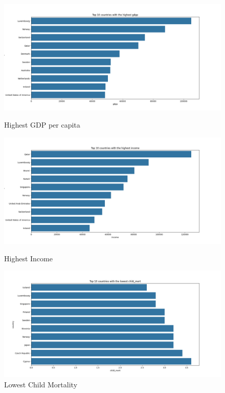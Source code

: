 \documentclass{article}
\begin{document}
\begin{figure}[H]
    \centering
    \begin{minipage}{0.8\textwidth}
        \centering
        \includegraphics[width=\linewidth]{plot/highest_gdpp.png}
        \caption{Highest GDP per capita}
        \label{fig:highest_gdpp}
    \end{minipage}
    \hfill
    \begin{minipage}{0.8\textwidth}
        \centering
        \includegraphics[width=\linewidth]{plot/highest_income.png}
        \caption{Highest Income}
        \label{fig:highest_income}
    \end{minipage}

    \begin{minipage}{0.8\textwidth}
        \centering
        \includegraphics[width=\linewidth]{plot/lowest_child_mort.png}
        \caption{Lowest Child Mortality}
        \label{fig:lowest_child_mort}
    \end{minipage}
    \hfill
\end{figure}
\end{document}
